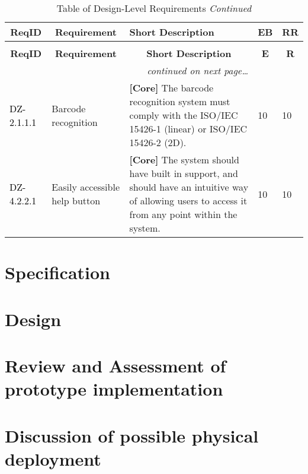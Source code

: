 \documentclass[a4paper]{article}
\begin{document}

\begin{longtable}{|l|p{5cm}|p{7cm}|p{0.5cm}|p{0.5cm}|}
  \caption{Table of Design-Level Requirements}\\
  \hline
  \multicolumn{1}{|c|}{\textbf{ReqID}}  &
  \multicolumn{1}{|c|}{\textbf{Requirement}} &
  \textbf{Short Description}&
  \textbf{EB} & 
  \textbf{RR}\\
  \hline\hline
  \endfirsthead
  \caption[]{Table of Design-Level Requirements \textit{Continued}}\\
  \hline
  \multicolumn{1}{|c|}{\textbf{ReqID}} &
  \multicolumn{1}{|c|}{\textbf{Requirement}} &
  \multicolumn{1}{|c|}{\textbf{Short Description}} & 
  \multicolumn{1}{|c|}{\textbf{E}} & 
  \multicolumn{1}{|c|}{\textbf{R}}\\
  \hline\hline
  \endhead
  \hline
  \multicolumn{3}{r}{\textit{continued on next page\ldots}}\\
  \endfoot
  \hline
  \endlastfoot
  
\textcolor{black}{DZ-2.1.1.1}  &  Barcode recognition     & \textbf{[Core] }The barcode recognition system must comply with the ISO/IEC 15426-1 (linear) or ISO/IEC 15426-2 (2D).& 10 & 10\\
  \hline
  \textcolor{black}{DZ-4.2.2.1}  &  Easily accessible help button     & \textbf{[Core] }The system should have built in support, and should have an intuitive way of allowing users to access it from any point within the system.& 10 & 10\\
  \hline
 \hline
\end{longtable}

\pagebreak






\section{Specification}

\section{Design}
\section{Review and Assessment of prototype implementation}
\pagebreak
\section{Discussion of possible physical deployment}
\pagebreak
\end{document}
